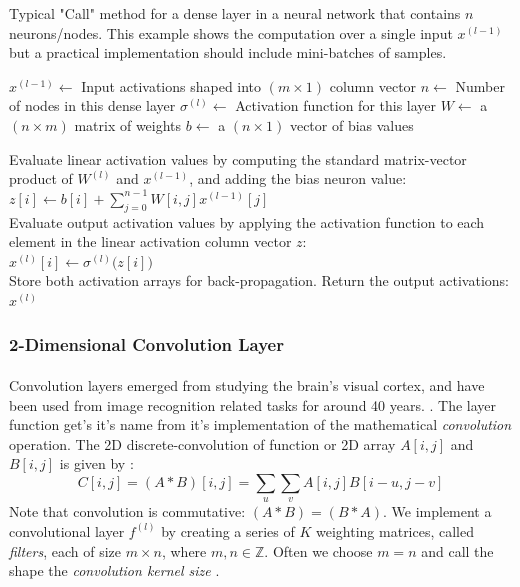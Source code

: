 \documentclass[12pt,letterpaper]{article}
\begin{document}
\begin{algorithm}[H]
\caption{Typical "Call" method for a dense layer in a neural network that contains $n$ neurons/nodes. This example shows the computation over a single input $x^{(l-1)}$ but a practical implementation should include mini-batches of samples.}
\label{alg-CallDense}

\begin{algorithmic}
\REQUIRE $x^{(l-1)} \leftarrow$ Input activations shaped into $(m \times 1)$ column vector
\REQUIRE $n \leftarrow$ Number of nodes in this dense layer
\REQUIRE $\sigma^{(l)} \leftarrow$ Activation function for this layer
\REQUIRE $W \leftarrow$ a $(n \times m)$ matrix of weights
\REQUIRE $b \leftarrow$ a $(n \times 1)$ vector of bias values

Evaluate linear activation values by computing the standard matrix-vector product of $W^{(l)}$ and $x^{(l-1)}$, and adding the bias neuron value:\\
$z[i] \leftarrow b[i] + \sum_{j=0}^{n-1} W[i,j] x^{(l-1)}[j]$ \\
Evaluate output activation values by applying the activation function to each element in the linear activation column vector $z$:\\
$x^{(l)}[i] \leftarrow \sigma^{(l)}\big( z[i] \big)$ \\

Store both activation arrays for back-propagation. Return the output activations:\\
\RETURN $x^{(l)}$

\end{algorithmic}
\end{algorithm}


\subsubsection{2-Dimensional Convolution Layer}
\label{subsubsec-Conv2DLayer}

\paragraph*{}Convolution layers emerged from studying the brain's visual cortex, and have been used from image recognition related tasks for around 40 years. \cite{Geron,Loy}. The layer function get's it's name from it's implementation of the mathematical \textit{convolution} operation. The 2D discrete-convolution of function or 2D array $A[i,j]$ and $B[i,j]$ is given by \cite{Goodfellow}:
\begin{equation}
\label{eqn-convolution}
C[i,j] = (A * B)[i,j] = \sum_{u}\sum_{v} A[i,j]B[i - u,j - v]
\end{equation}
Note that convolution is commutative: $(A * B) = (B * A)$. We implement a convolutional layer $f^{(l)}$ by creating a series of $K$ weighting matrices, called \textit{filters}, each of size $m \times n$, where $m,n \in \mathbb{Z}$. Often we choose $m = n$ and call the shape the \textit{convolution kernel size} \cite{Loy, Goodfellow}.
\end{document}
